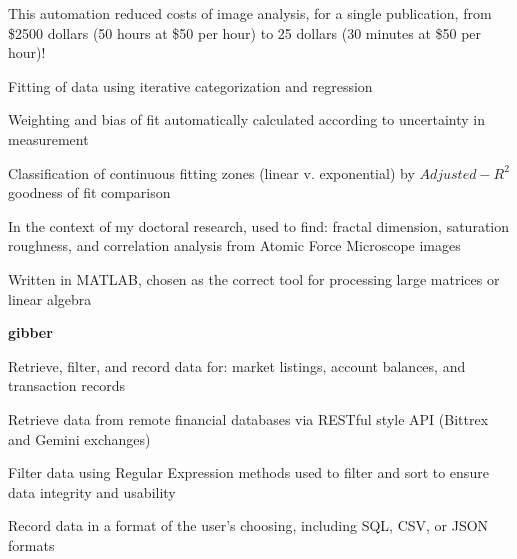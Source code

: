 \documentclass[letterpaper,final]{memoir}
\newcommand{\LargeSep}{\vspace{1.3em}}
\newcommand{\Sep}{\vspace{1.0em}}
\newcommand{\SmallSep}{\vspace{0.4em}}
\newcommand{\CVItem}[1]
	{\textbf{\color{Blue} #1}}
\begin{document}
\begin{compactitem}[\color{Blue}$\circ$]
   
    \SmallSep

    \item This automation reduced costs of image analysis, for a single publication, from \$2500 dollars (50 hours at \$50 per hour) to 25 dollars (30 minutes at \$50 per hour)!

    \item Fitting of data using iterative categorization and regression

    \item Weighting and bias of fit automatically calculated according to uncertainty in measurement

    \item Classification of continuous fitting zones (linear v. exponential) by $Adjusted-R^2$ goodness of fit comparison

    \item In the context of my doctoral research, used to find: fractal dimension, saturation roughness, and correlation analysis from Atomic Force Microscope images

    \item Written in MATLAB, chosen as the correct tool for processing large matrices or linear algebra
    \Sep

\end{compactitem}


\CVItem{gibber} 

\begin{compactitem}[\color{Blue}$\circ$]

    \SmallSep
    
    \item Retrieve, filter, and record data for: market listings, account balances, and transaction records
    
    \item Retrieve data from remote financial databases via RESTful style API (Bittrex and Gemini exchanges)
    
    \item Filter data using Regular Expression methods used to filter and sort to ensure data integrity and usability
    
    \item Record data in a format of the user's choosing, including SQL, CSV, or JSON formats
    
\end{compactitem}
\LargeSep
\end{document}
